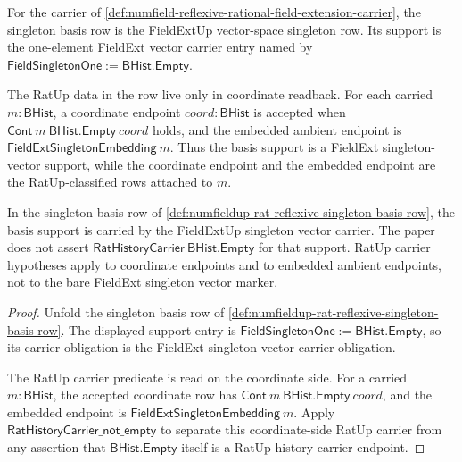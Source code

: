 \begin{definition}
\label{def:numfieldup-rat-reflexive-singleton-basis-row}
For the carrier of
\autoref{def:numfield-reflexive-rational-field-extension-carrier}, the singleton
basis row is the FieldExtUp vector-space singleton row. Its support is the
one-element FieldExt vector carrier entry named by
$\mathsf{FieldSingletonOne}:=\mathsf{BHist.Empty}$.

The RatUp data in the row live only in coordinate readback. For each carried
$m:\mathsf{BHist}$, a coordinate endpoint $coord:\mathsf{BHist}$ is accepted
when $\mathsf{Cont}\ m\ \mathsf{BHist.Empty}\ coord$ holds, and the embedded
ambient endpoint is $\mathsf{FieldExtSingletonEmbedding}\ m$. Thus the basis
support is a FieldExt singleton-vector support, while the coordinate endpoint
and the embedded endpoint are the RatUp-classified rows attached to $m$.
\end{definition}

\begin{theorem}
\label{thm:numfieldup-rat-reflexive-basis-carried}
In the singleton basis row of
\autoref{def:numfieldup-rat-reflexive-singleton-basis-row}, the basis support is
carried by the FieldExtUp singleton vector carrier. The paper does not assert
$\mathsf{RatHistoryCarrier}\ \mathsf{BHist.Empty}$ for that support. RatUp
carrier hypotheses apply to coordinate endpoints and to embedded ambient
endpoints, not to the bare FieldExt singleton vector marker.
\end{theorem}
\begin{proof}
Unfold the singleton basis row of
\autoref{def:numfieldup-rat-reflexive-singleton-basis-row}. The displayed
support entry is
$\mathsf{FieldSingletonOne}:=\mathsf{BHist.Empty}$, so its carrier obligation is
the FieldExt singleton vector carrier obligation.

The RatUp carrier predicate is read on the coordinate side. For a carried
$m:\mathsf{BHist}$, the accepted coordinate row has
$\mathsf{Cont}\ m\ \mathsf{BHist.Empty}\ coord$, and the embedded endpoint is
$\mathsf{FieldExtSingletonEmbedding}\ m$. Apply
$\mathsf{RatHistoryCarrier\_not\_empty}$ to separate this coordinate-side
RatUp carrier from any assertion that $\mathsf{BHist.Empty}$ itself is a RatUp
history carrier endpoint.
\end{proof}

